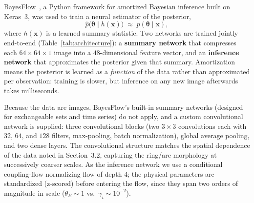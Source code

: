 \documentclass[11pt,a4paper]{article}
\begin{document}
BayesFlow~\cite{radev2020bayesflow,bayesflow2023software}, a Python framework for
amortized Bayesian inference built on Keras~3, was used to train a neural estimator
of the posterior,
\begin{equation}
\hat p\big(\boldsymbol\theta \mid h(\mathbf{x})\big) \;\approx\;
p(\boldsymbol\theta \mid \mathbf{x}),
\end{equation}
where $h(\mathbf{x})$ is a learned summary statistic. Two networks are trained
jointly end-to-end (Table~\ref{tab:architecture}): a \textbf{summary network} that
compresses each $64\times64\times1$ image into a $48$-dimensional feature vector,
and an \textbf{inference network} that approximates the posterior given that
summary. Amortization means the posterior is learned as a \emph{function} of the
data rather than approximated per observation: training is slower, but inference on
any new image afterwards takes milliseconds.

Because the data are images, BayesFlow's built-in summary networks (designed for
exchangeable sets and time series) do not apply, and a custom convolutional network
is supplied: three convolutional blocks (two $3\times3$ convolutions each with
$32$, $64$, and $128$ filters, max-pooling, batch normalization), global average
pooling, and two dense layers. The convolutional structure matches the spatial
dependence of the data noted in Section~3.2, capturing the ring/arc morphology at
successively coarser scales. As the inference network we use a conditional
coupling-flow normalizing flow of depth $4$; the physical parameters are
standardized (z-scored) before entering the flow, since they span two orders of
magnitude in scale ($\theta_E \sim 1$ vs.\ $\gamma_i \sim 10^{-2}$).
\end{document}

